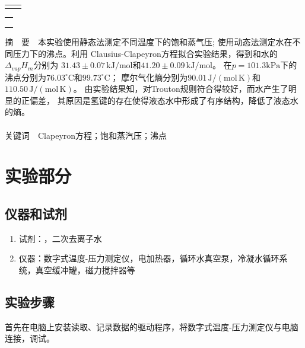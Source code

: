 \documentclass[12pt]{article}
\newcommand{\mr}[1]{\mathrm{#1}}
\def\celsius{^{\circ}\mr{C}}  %
\begin{document}
\begin{titlepage}
\begin{center}
\begin{tabular}{cp{5cm}}
{				}\\
                \cline{2-2}
            \end{tabular}
            \begin{tabular*}{\textwidth}{c}
                \\ %
                \\ %
                \\ %
                \\ %
                \hline %
            \end{tabular*}
        \end{center}
        \textsf{摘\ \ 要}\ \ 本实验使用静态法测定不同温度下的饱和蒸气压;
		使用动态法测定水在不同压力下的沸点。利用
		Clausius-Clapeyron方程拟合实验结果，得到和水的$\Delta_{vap}H_{m}$分别为
		$31.43 \pm 0.07\,\mr{kJ/mol}$和$41.20 \pm 0.09\,\mr{kJ/mol}$。
		在$p = 101.3\mr{kPa}$下的沸点分别为$76.03\celsius$和$99.73\celsius$；
		摩尔气化熵分别为$90.01\,\mr{J/(mol\,K)}$和$110.50\,\mr{J/(mol\,K)}$。
		由实验结果知，对Trouton规则符合得较好，而水产生了明显的正偏差，
		其原因是氢键的存在使得液态水中形成了有序结构，降低了液态水的熵。
        \\
        \\
        \textsf{关键词}\ \ Clapeyron方程；饱和蒸汽压；沸点
    \end{titlepage}
	\vbox{}        
    \section{实验部分}
    	\subsection{仪器和试剂}
    	\begin{enumerate}
			\item 试剂：，二次去离子水
			\item 仪器：数字式温度-压力测定仪，电加热器，循环水真空泵，冷凝水循环系统，真空缓冲罐，磁力搅拌器等
		\end{enumerate}
    	
		\subsection{实验步骤}
			首先在电脑上安装读取、记录数据的驱动程序，将数字式温度-压力测定仪与电脑连接，调试。
\end{document}
